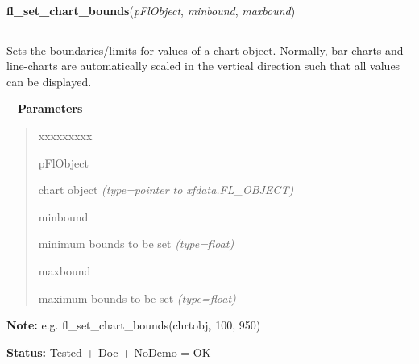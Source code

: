     \label{xformslib:flchart:fl_set_chart_bounds}

    \vspace{0.5ex}

\hspace{.8\funcindent}\begin{boxedminipage}{\funcwidth}

    \raggedright \textbf{fl\_set\_chart\_bounds}(\textit{pFlObject}, \textit{minbound}, \textit{maxbound})

    \vspace{-1.5ex}

    \rule{\textwidth}{0.5\fboxrule}
\setlength{\parskip}{2ex}

Sets the boundaries/limits for values of a chart object. Normally,
bar-charts and line-charts are automatically scaled in the vertical
direction such that all values can be displayed.

-{}-
\setlength{\parskip}{1ex}
      \textbf{Parameters}
      \vspace{-1ex}

      \begin{quote}
        \begin{Ventry}{xxxxxxxxx}

          \item[pFlObject]


chart object
            {\it (type=pointer to xfdata.FL\_OBJECT)}

          \item[minbound]


minimum bounds to be set
            {\it (type=float)}

          \item[maxbound]


maximum bounds to be set
            {\it (type=float)}

        \end{Ventry}

      \end{quote}

\textbf{Note:} 
e.g. fl\_set\_chart\_bounds(chrtobj, 100, 950)


\textbf{Status:} 
Tested + Doc + NoDemo = OK


    \end{boxedminipage}

    \label{xformslib:flchart:fl_get_chart_bounds}

